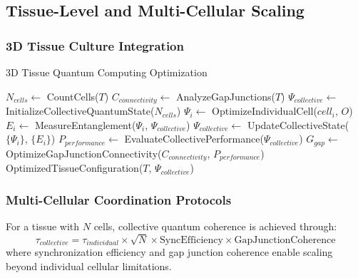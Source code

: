 ﻿\documentclass[11pt,a4paper]{article}
\begin{document}
\begin{itemize}
\begin{itemize}
\subsection{Tissue-Level and Multi-Cellular Scaling}

\subsubsection{3D Tissue Culture Integration}

\begin{algorithm}
\caption{3D Tissue Quantum Computing Optimization}
\begin{algorithmic}
    \State $N_{cells} \leftarrow$ CountCells($T$)
    \State $C_{connectivity} \leftarrow$ AnalyzeGapJunctions($T$)
    \State $\Psi_{collective} \leftarrow$ InitializeCollectiveQuantumState($N_{cells}$)
            \State $\Psi_i \leftarrow$ OptimizeIndividualCell($cell_i$, $O$)
            \State $E_i \leftarrow$ MeasureEntanglement($\Psi_i$, $\Psi_{collective}$)
        \EndFor
        \State $\Psi_{collective} \leftarrow$ UpdateCollectiveState($\{\Psi_i\}$, $\{E_i\}$)
        \State $P_{performance} \leftarrow$ EvaluateCollectivePerformance($\Psi_{collective}$)
        \State $G_{gap} \leftarrow$ OptimizeGapJunctionConnectivity($C_{connectivity}$, $P_{performance}$)
    \EndFor
    \State \Return OptimizedTissueConfiguration($T$, $\Psi_{collective}$)
\EndProcedure
\end{algorithmic}
\end{algorithm}

\subsubsection{Multi-Cellular Coordination Protocols}

\begin{definition}
For a tissue with $N$ cells, collective quantum coherence is achieved through:
\begin{equation}
\tau_{collective} = \tau_{individual} \times \sqrt{N} \times \text{SyncEfficiency} \times \text{GapJunctionCoherence}
\end{equation}
where synchronization efficiency and gap junction coherence enable scaling beyond individual cellular limitations.
\end{definition}


\end{itemize}
\end{itemize}
\end{document}
